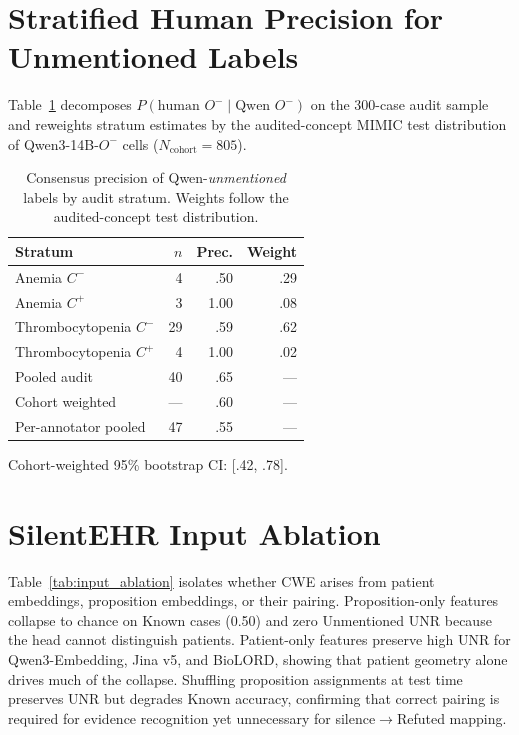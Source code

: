 \documentclass[11pt]{article}
\begin{document}
\section{Stratified Human Precision for Unmentioned Labels}
\label{app:audit_ominus_precision}

Table~\ref{tab:audit_ominus_precision} decomposes $P(\text{human }O^- \mid
\text{Qwen }O^-)$ on the 300-case audit sample and reweights stratum
estimates by the audited-concept MIMIC test distribution of Qwen3-14B-$O^-$
cells ($N_{\text{cohort}}=805$).

\begin{table}[!htbp]
  \centering
  \footnotesize
  \renewcommand{\arraystretch}{1.08}
  \caption{Consensus precision of Qwen-\emph{unmentioned} labels by audit
  stratum. Weights follow the audited-concept test distribution.}
  \label{tab:audit_ominus_precision}
  \begin{tabular*}{\columnwidth}{@{\extracolsep{\fill}}lrrr@{}}
    \toprule
    \textbf{Stratum} & \textbf{$n$} & \textbf{Prec.} & \textbf{Weight} \\
    \midrule
    Anemia $C^-$           & 4  & .50 & .29 \\
    Anemia $C^+$           & 3  & 1.00 & .08 \\
    Thrombocytopenia $C^-$ & 29 & .59 & .62 \\
    Thrombocytopenia $C^+$ & 4  & 1.00 & .02 \\
    \midrule
    Pooled audit           & 40 & .65 & --- \\
    Cohort weighted        & --- & .60 & --- \\
    Per-annotator pooled   & 47 & .55 & --- \\
    \bottomrule
  \end{tabular*}
  \vspace{2pt}
  {\scriptsize Cohort-weighted 95\% bootstrap CI: [.42, .78].}
\end{table}

\FloatBarrier

\section{SilentEHR Input Ablation}
\label{app:input_ablation}

Table~\ref{tab:input_ablation} isolates whether CWE arises from patient
embeddings, proposition embeddings, or their pairing. Proposition-only features
collapse to chance on Known cases (0.50) and zero Unmentioned UNR because the
head cannot distinguish patients. Patient-only features preserve high UNR for
Qwen3-Embedding, Jina v5, and BioLORD, showing that patient geometry alone
drives much of the collapse. Shuffling proposition assignments at test time
preserves UNR but degrades Known accuracy, confirming that correct pairing is
required for evidence recognition yet unnecessary for silence$\to$Refuted
mapping.
\end{document}
